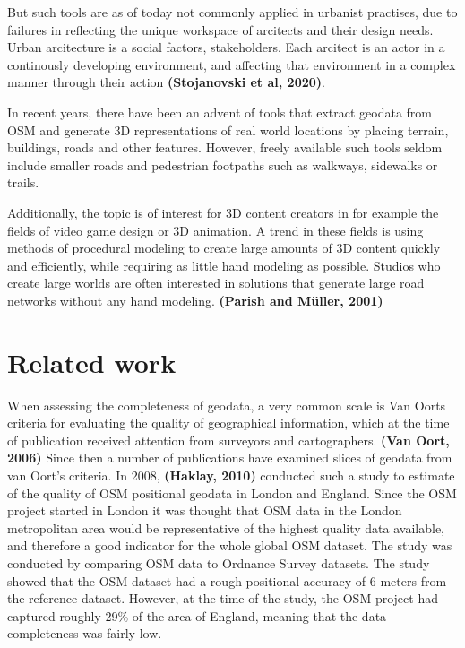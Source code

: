 \documentclass{kththesis}
\begin{document}
But such tools are as of today not commonly applied in urbanist practises, due to failures in reflecting the unique workspace of arcitects and their design needs. Urban arcitecture is a social factors, stakeholders. Each arcitect is an actor in a continously developing environment, and affecting that environment in a complex manner through their action \textbf{(Stojanovski et al, 2020)}.

In recent years, there have been an advent of tools that extract geodata from OSM and generate 3D representations of real world locations by placing terrain, buildings, roads and other features.
However, freely available such tools seldom include smaller roads and pedestrian footpaths such as walkways, sidewalks or trails.

Additionally, the topic is of interest for 3D content creators in for example the fields of video game design or 3D animation. A trend in these fields is using methods of procedural modeling to create large amounts of 3D content quickly and efficiently, while requiring as little hand modeling as possible. Studios who create large worlds are often interested in solutions that generate large road networks without any hand modeling. \textbf{(Parish and Müller, 2001)}

\section{Related work}
When assessing the completeness of geodata, a very common scale is Van Oorts criteria for evaluating the quality of geographical information, which at the time of publication received attention from surveyors and cartographers.
\textbf{(Van Oort, 2006)} Since then a number of publications have examined slices of geodata from van Oort's criteria.
In 2008, \textbf{(Haklay, 2010)} conducted such a study to estimate of the quality of OSM positional geodata in London and England.
Since the OSM project started in London it was thought that OSM data in the London metropolitan area would be representative of the highest quality data available, and therefore a good indicator for the whole global OSM dataset.
The study was conducted by comparing OSM data to Ordnance Survey datasets.
The study showed that the OSM dataset had a rough positional accuracy of 6 meters from the reference dataset.
However, at the time of the study, the OSM project had captured roughly 29\% of the area of England, meaning that the data completeness was fairly low.
\end{document}
